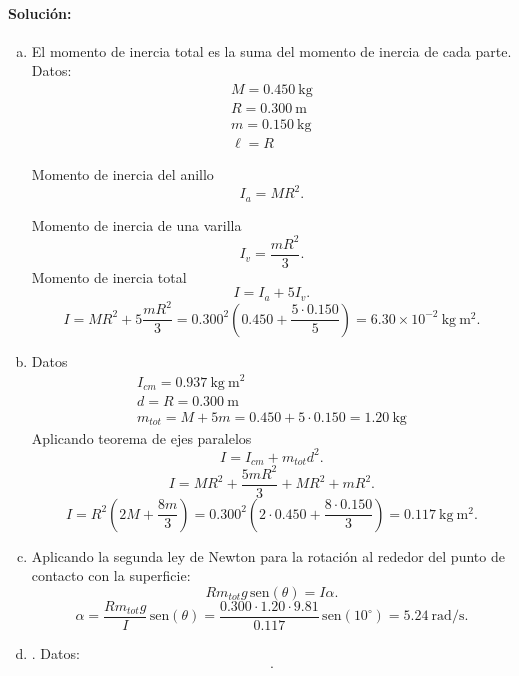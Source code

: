 \documentclass[
  12pt,
]{article}
\newcommand{\sen}{\, \mathrm{sen}}
\newcommand{\unit}[1]{\:\mathrm{#1}}
\begin{document}
\paragraph{Solución:}
\begin{enumerate}[a)]
  \item El momento de inercia total es la suma del momento
    de inercia de cada parte. 
    Datos:
  \[\begin{array}{l}
    M = 0.450\unit{kg} \\
    R = 0.300\unit{m}\\
    m = 0.150\unit{kg} \\
    \ell = R
  \end{array}\]

Momento de inercia del anillo
\[
  I_a = MR^2
.\] 

Momento de inercia de una varilla
\[
  I_v = \frac{mR^2}{3}
.\] 
Momento de inercia total
\[
  I = I_a + 5 I_v
.\] 
\[
  I = MR^2 + 5 \frac{mR^2}{3}
  = 0.300^2\left( 0.450 + \frac{5\cdot 0.150}{5} \right) 
  = 6.30\times 10^{-2}\unit{kg\:m^2}
.\] 
  \item 
  Datos
  \[\begin{array}{l}
    I_{cm} = 0.937 \unit{kg\:m^2}\\
    d = R = 0.300\unit{m}\\
    m_{tot} = M + 5m
    = 0.450 + 5 \cdot 0.150
    = 1.20 \unit{kg}
  \end{array}\]
  Aplicando teorema de ejes paralelos
  \[
    I = I_{cm} + m_{tot} d^2
  .\] 
  \[
    I = MR^2 + \frac{5mR^2}{3} + MR^2 + mR^2
  .\] 
  \[
    I = R^2\left( 2 M + \frac{8m}{3} \right) 
    = 0.300^2 \left( 2 \cdot 0.450 + \frac{8\cdot 0.150}{3} \right) 
    = 0.117 \unit{kg\:m^2}
  .\] 
  \item Aplicando la segunda ley de Newton para la rotación
    al rededor del punto de contacto con la superficie:
    \[
      R m_{tot} g \sen(\theta) = I \alpha
    .\] 
    \[
      \alpha = \frac{Rm_{tot}g}{I} \sen(\theta)
      = \frac{0.300 \cdot 1.20 \cdot 9.81}{0.117} \sen(10^{\circ})
      = 5.24 \unit{rad/s}
    .\] 
  \item .
Datos:
\[\begin{array}{l}
  .
\end{array}\]


\end{enumerate}
\end{document}
